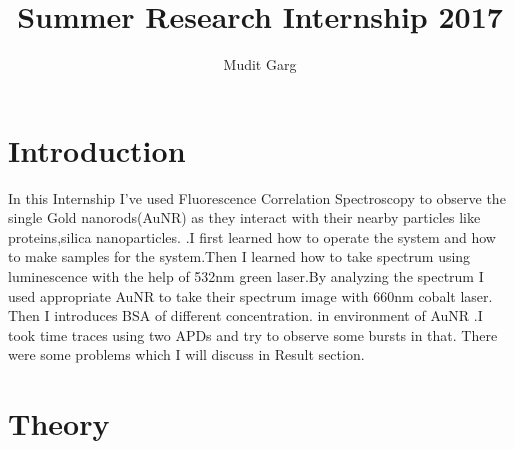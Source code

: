 \documentclass[twoside,single]{lion-msc}
\title{Summer Research Internship 2017}
\author{Mudit Garg}
\affiliation{Indian Institute of Technology Delhi}   %
\begin{document}


\maketitle

\tableofcontents
\cleardoublepage




\chapter{Introduction}

In this Internship I've used Fluorescence Correlation Spectroscopy to observe the single Gold nanorods(AuNR) as they interact with their nearby particles like proteins,silica nanoparticles.\cite{AuNR1} .I first learned how to operate the system and how to make samples for the system.Then I learned how to take spectrum using luminescence with the help of 532nm green laser.By analyzing the spectrum I used appropriate AuNR to take their spectrum image with 660nm cobalt laser. Then I introduces BSA of different concentration. in environment of AuNR .I took time traces using two APDs and try to observe some bursts in that. There were some problems which I will discuss in Result section.

\chapter{Theory}
\end{document}
